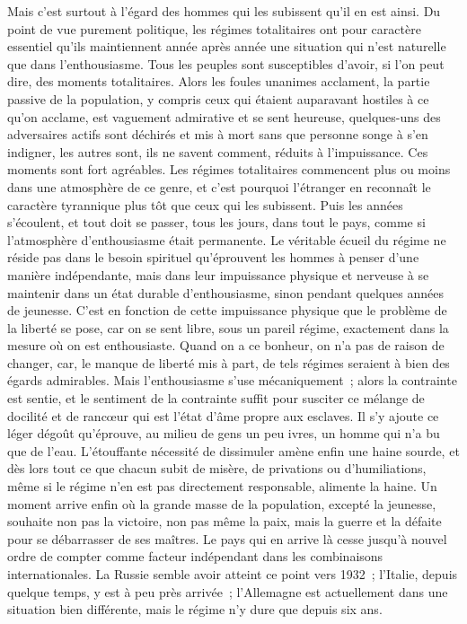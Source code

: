 \documentclass[french,twoside]{book} %
\begin{document}
Mais c'est surtout à l'égard des hommes qui les subissent qu'il en est ainsi. Du point de vue purement politique, les régimes totalitaires ont pour caractère essentiel qu'ils maintiennent année après année une situation qui n'est naturelle que dans l'enthousiasme. Tous les peuples sont susceptibles d'avoir, si l'on peut dire, des moments totalitaires. Alors les foules unanimes accla­ment, la partie passive de la population, y compris ceux qui étaient auparavant hostiles à ce qu'on acclame, est vaguement admirative et se sent heureuse, quelques-uns des adversaires actifs sont déchirés et mis à mort sans que personne songe à s'en indigner, les autres sont, ils ne savent comment, réduits à l'impuissance. Ces moments sont fort agréables. Les régimes totalitaires commencent plus ou moins dans une atmosphère de ce genre, et c'est pourquoi l'étranger en reconnaît le caractère tyrannique plus tôt que ceux qui les subissent. Puis les années s'écoulent, et tout doit se passer, tous les jours, dans tout le pays, comme si l'atmosphère d'enthousiasme était permanente. Le véritable écueil du régime ne réside pas dans le besoin spirituel qu'éprouvent les hommes à penser d'une manière indépendante, mais dans leur impuissance physique et nerveuse à se maintenir dans un état durable d'enthousiasme, sinon pendant quelques années de jeunesse. C'est en fonction de cette impuis­sance physique que le problème de la liberté se pose, car on se sent libre, sous un pareil régime, exactement dans la mesure où on est enthousiaste. Quand on a ce bonheur, on n'a pas de raison de changer, car, le manque de liberté mis à part, de tels régimes seraient à bien des égards admirables. Mais l'enthou­siasme s'use mécaniquement ; alors la contrainte est sentie, et le sentiment de la contrainte suffit pour susciter ce mélange de docilité et de rancœur qui est l'état d'âme propre aux esclaves. Il s'y ajoute ce léger dégoût qu'éprouve, au milieu de gens un peu ivres, un homme qui n'a bu que de l'eau. L'étouffante nécessité de dissimuler amène enfin une haine sourde, et dès lors tout ce que chacun subit de misère, de privations ou d'humiliations, même si le régime n'en est pas directement responsable, alimente la haine. Un moment arrive enfin où la grande masse de la population, excepté la jeunesse, souhaite non pas la victoire, non pas même la paix, mais la guerre et la défaite pour se débarrasser de ses maîtres. Le pays qui en arrive là cesse jusqu'à nouvel ordre de compter comme facteur indépendant dans les combinaisons internationales. La Russie semble avoir atteint ce point vers 1932 ; l'Italie, depuis quelque temps, y est à peu près arrivée ; l'Allemagne est actuellement dans une situation bien différente, mais le régime n'y dure que depuis six ans.\par
\end{document}
